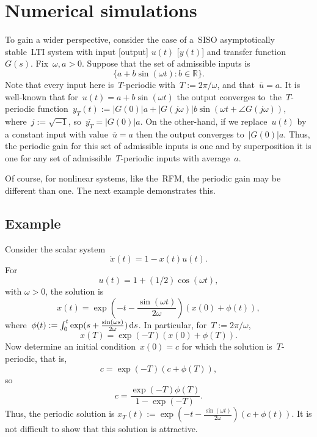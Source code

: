 \section{Numerical simulations} \label{sec:simu}

To gain a wider perspective, consider the case of a~\ac{SISO} asymptotically stable~\ac{LTI} system with input [output] $u(t)$ [$y(t)$] and transfer function~$G(s)$. 
Fix~$\omega,a>0$. 
Suppose that  the set of admissible inputs is
\[
\{    a+b\sin(\omega t):  b\in \mathbb R \}.
\]
Note that every input here is~$T$-periodic with~$T:=2\pi/\omega $, and that~$\overline u=a$. 
It is well-known that for~$u(t)=a+b\sin(\omega t)$ the output converges to~the~$T $-periodic function~$y_T(t):=|G(0)| a+|G(j\omega)| b   \sin(\omega t+ \angle G(j \omega))$, where~$j:=\sqrt{-1}$, so~$ \overline {y_T} =|G(0)| a  $. 
On the other-hand, if we replace~$u(t)$ by a constant input with value~$\overline u=a$ then the output converges to~$|G(0)| a$.
Thus, the periodic gain for this set of admissible inputs is one and by superposition it is one for any set of admissible~$T$-periodic inputs with average~$a$.  

Of course, for nonlinear systems, like the~\ac{RFM}, the periodic gain may be different than one. 
The next  example demonstrates this.

\subsection{Example} \label{subsec:sinsimp}
Consider the scalar system
\begin{equation} \label{eq:smsi}
	\dot x(t)= 1-x(t) u(t).
\end{equation}
%
For
%
\begin{equation} \label{eq:perub}
	u(t)=1 +(1/2) \cos(\omega t) ,
\end{equation}
%
with $\omega>0$, the solution is
%
\begin{equation}
	x(t)=\exp(-t-\frac{\sin(\omega t)}{2\omega } ) (x(0)+ \phi(t)) ,
\end{equation}
%
where~$\phi(t):=\int_0^t \exp(s+\frac{ \sin(\omega s)}{2\omega} ) \mathop{}\!\mathrm{d} s$. 
%
In particular, for~$T:=2\pi/\omega$,
%
\begin{equation}
	x(T)=\exp(-T  ) (x(0)+ \phi(T) ).
\end{equation}
%
Now determine an initial condition~$x(0)=c$ for which the solution is~$T $-periodic, that is, 
%
\begin{equation}
	c=\exp(-T) (c+ \phi(T)),
\end{equation}
%
so
%
\begin{equation}
	c=\frac{\exp(-T) \phi(T)}{ 1-\exp(-T)}.
\end{equation}
%
Thus, the periodic solution is  $x_T(t):= \exp(-t-\frac{ \sin( \omega t)}{2\omega}  ) (c+ \phi(t)) $.
It is not difficult to show that this solution is attractive. 


